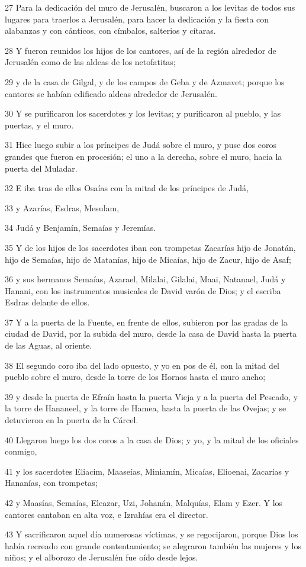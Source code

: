 \par 27 Para la dedicación del muro de Jerusalén, buscaron a los levitas de todos sus lugares para traerlos a Jerusalén, para hacer la dedicación y la fiesta con alabanzas y con cánticos, con címbalos, salterios y cítaras.
\par 28 Y fueron reunidos los hijos de los cantores, así de la región alrededor de Jerusalén como de las aldeas de los netofatitas; 
\par 29 y de la casa de Gilgal, y de los campos de Geba y de Azmavet; porque los cantores se habían edificado aldeas alrededor de Jerusalén.
\par 30 Y se purificaron los sacerdotes y los levitas; y purificaron al pueblo, y las puertas, y el muro.
\par 31 Hice luego subir a los príncipes de Judá sobre el muro, y puse dos coros grandes que fueron en procesión; el uno a la derecha, sobre el muro, hacia la puerta del Muladar.
\par 32 E iba tras de ellos Osaías con la mitad de los príncipes de Judá,
\par 33 y Azarías, Esdras, Mesulam,
\par 34 Judá y Benjamín, Semaías y Jeremías.
\par 35 Y de los hijos de los sacerdotes iban con trompetas Zacarías hijo de Jonatán, hijo de Semaías, hijo de Matanías, hijo de Micaías, hijo de Zacur, hijo de Asaf;
\par 36 y sus hermanos Semaías, Azarael, Milalai, Gilalai, Maai, Natanael, Judá y Hanani, con los instrumentos musicales de David varón de Dios; y el escriba Esdras delante de ellos.
\par 37 Y a la puerta de la Fuente, en frente de ellos, subieron por las gradas de la ciudad de David, por la subida del muro, desde la casa de David hasta la puerta de las Aguas, al oriente.
\par 38 El segundo coro iba del lado opuesto, y yo en pos de él, con la mitad del pueblo sobre el muro, desde la torre de los Hornos hasta el muro ancho;
\par 39 y desde la puerta de Efraín hasta la puerta Vieja y a la puerta del Pescado, y la torre de Hananeel, y la torre de Hamea, hasta la puerta de las Ovejas; y se detuvieron en la puerta de la Cárcel.
\par 40 Llegaron luego los dos coros a la casa de Dios; y yo, y la mitad de los oficiales conmigo,
\par 41 y los sacerdotes Eliacim, Maaseías, Miniamín, Micaías, Elioenai, Zacarías y Hananías, con trompetas;
\par 42 y Maasías, Semaías, Eleazar, Uzi, Johanán, Malquías, Elam y Ezer. Y los cantores cantaban en alta voz, e Izrahías era el director.
\par 43 Y sacrificaron aquel día numerosas víctimas, y se regocijaron, porque Dios los había recreado con grande contentamiento; se alegraron también las mujeres y los niños; y el alborozo de Jerusalén fue oído desde lejos.

